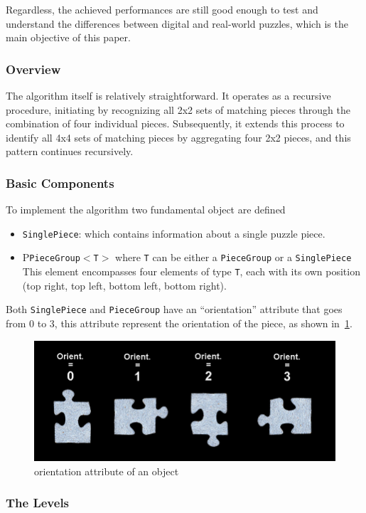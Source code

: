 \documentclass{article}
\begin{document}
Regardless, the achieved performances are still good enough to test and understand
the differences between digital and real-world puzzles,
which is the main objective of this paper.

\subsubsection{Overview}
The algorithm itself is relatively straightforward.
It operates as a recursive procedure, initiating by recognizing all 2x2
sets of matching pieces through the combination of four individual pieces.
Subsequently, it extends this process to identify all 4x4 sets of matching pieces
by aggregating four 2x2 pieces, and this pattern continues recursively.

\subsubsection{Basic Components}
To implement the algorithm two fundamental object are defined
\begin{itemize}
  \item \texttt{SinglePiece}: which contains information about a single puzzle piece.
  \item P\texttt{PieceGroup\(<\)T\(>\)} where \texttt{T} can be either a \texttt{PieceGroup} or a \texttt{SinglePiece}\newline
  This element encompasses four elements of type \texttt{T}, each with its own position (top right, top left, bottom left, bottom right).
\end{itemize}
Both \texttt{SinglePiece} and \texttt{PieceGroup} have an ``orientation'' attribute that goes from 0 to 3, this attribute
represent the orientation of the piece, as shown in~\cref{fig:orientation}.
\begin{figure}[H]
  \caption{orientation attribute of an object}\label{fig:orientation}
  \centering
  \includegraphics[height=0.3\textwidth]{pictures/orientation.png}
\end{figure}

\subsubsection{The Levels}
\end{document}
